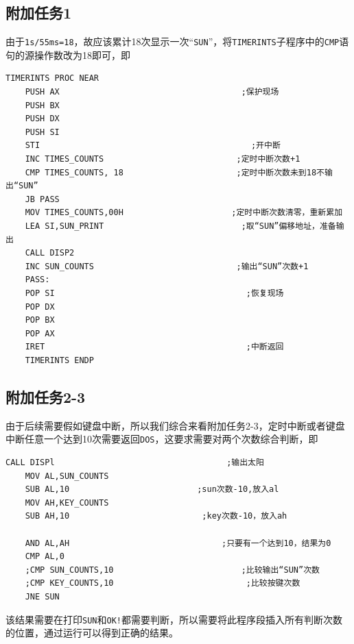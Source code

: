 \documentclass[11pt]{SEU-Digital-Report}
\begin{document}
\subsection{附加任务1}
由于\texttt{1s/55ms=18}，故应该累计18次显示一次“\texttt{SUN}”，将\texttt{TIMERINTS}子程序中的\texttt{CMP}语句的源操作数改为18即可，即
\begin{lstlisting}[language={[x86masm]Assembler},title=code]
    TIMERINTS PROC NEAR
    PUSH AX                                     ;保护现场
    PUSH BX
    PUSH DX
    PUSH SI
    STI                                           ;开中断
    INC TIMES_COUNTS                           ;定时中断次数+1
    CMP TIMES_COUNTS, 18                       ;定时中断次数未到18不输出“SUN”
    JB PASS
    MOV TIMES_COUNTS,00H                      ;定时中断次数清零，重新累加
    LEA SI,SUN_PRINT                            ;取“SUN”偏移地址，准备输出
    CALL DISP2
    INC SUN_COUNTS                             ;输出“SUN”次数+1
    PASS:
    POP SI                                       ;恢复现场
    POP DX
    POP BX
    POP AX      
    IRET                                         ;中断返回
    TIMERINTS ENDP
\end{lstlisting}
\subsection{附加任务2-3}
由于后续需要假如键盘中断，所以我们综合来看附加任务2-3，定时中断或者键盘中断任意一个达到10次需要返回\texttt{DOS}，这要求需要对两个次数综合判断，即
\begin{lstlisting}[language={[x86masm]Assembler},title=code]
    CALL DISPl                                   ;输出太阳
    MOV AL,SUN_COUNTS   
    SUB AL,10                          ;sun次数-10,放入al 
    MOV AH,KEY_COUNTS
    SUB AH,10                           ;key次数-10，放入ah

    AND AL,AH                               ;只要有一个达到10，结果为0
    CMP AL,0
    ;CMP SUN_COUNTS,10                          ;比较输出“SUN”次数
    ;CMP KEY_COUNTS,10                           ;比较按键次数
    JNE SUN     
\end{lstlisting}
该结果需要在打印\texttt{SUN}和\texttt{OK!}都需要判断，所以需要将此程序段插入所有判断次数的位置，通过运行可以得到正确的结果。
\end{document}

